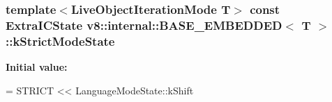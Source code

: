 \subsubsection[{\texorpdfstring{k\+Strict\+Mode\+State}{kStrictModeState}}]{\setlength{\rightskip}{0pt plus 5cm}template$<$Live\+Object\+Iteration\+Mode T$>$ const Extra\+I\+C\+State {\bf v8\+::internal\+::\+B\+A\+S\+E\+\_\+\+E\+M\+B\+E\+D\+D\+ED}$<$ T $>$\+::k\+Strict\+Mode\+State\hspace{0.3cm}{\ttfamily [static]}}\hypertarget{classv8_1_1internal_1_1_b_a_s_e___e_m_b_e_d_d_e_d_ac90595934c94c94418d564a6d9637582}{}\label{classv8_1_1internal_1_1_b_a_s_e___e_m_b_e_d_d_e_d_ac90595934c94c94418d564a6d9637582}
{\bfseries Initial value\+:}
\begin{DoxyCode}
= STRICT
                                               << LanguageModeState::kShift
\end{DoxyCode}


